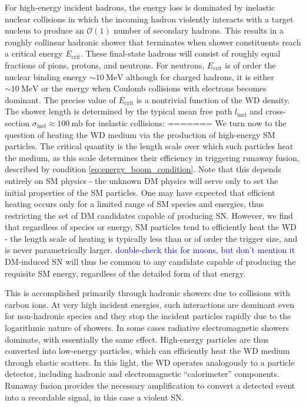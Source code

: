 \documentclass[twocolumn, preprintnumbers,amsmath,amssymb,prd, superscriptaddress]{revtex4}
\newcommand{\OO}{\mathcal{O}}
\newcommand{\MeV}{\text{MeV}}
\begin{document}
For high-energy incident hadrons, the energy loss is dominated by inelastic nuclear collisions in which the incoming hadron violently interacts with a target nucleus to produce an $\OO(1)$ number of secondary hadrons.
This results in a roughly collinear hadronic shower that terminates when shower constituents reach a critical energy $E_\text{crit}$.
These final-state hadrons will consist of roughly equal fractions of pions, protons, and neutrons.
For neutrons, $E_\text{crit}$ is of order the nuclear binding energy $\sim 10 ~\text{MeV}$ although for charged hadrons, it is either $\sim 10 ~\MeV$ or the energy when Coulomb collisions with electrons becomes dominant.
The precise value of $E_\text{crit}$ is a nontrivial function of the WD density.
The shower length is determined by the typical mean free path $l_\text{inel}$ and cross-section $\sigma_\text{inel} \approx 100 ~\text{mb}$ for inelastic collisions:
=======
We turn now to the question of heating the WD medium via the production of high-energy SM particles. 
The critical quantity is the length scale over which such particles heat the medium, as this scale determines their efficiency in triggering runaway fusion, described by condition \eqref{eq:energy_boom_condition}.   
Note that this depends entirely on SM physics - the unknown DM physics will serve only to set the initial properties of the SM particles.
One may have expected that efficient heating occurs only for a limited range of SM species and energies, thus restricting the set of DM candidates capable of producing SN. 
However, we find that regardless of species or energy, SM particles tend to efficiently heat the WD - the length scale of heating is typically less than or of order the trigger size, and is never parametrically larger.
\textcolor{blue}{double-check this for muons, but don't mention it}
DM-induced SN will thus be common to any candidate capable of producing the requisite SM energy, regardless of the detailed form of that energy. 

This is accomplished primarily through hadronic showers due to collisions with carbon ions. 
At very high incident energies, such interactions are dominant even for non-hadronic species and they stop the incident particles rapidly due to the logarithmic nature of showers. 
In some cases radiative electromagnetic showers dominate, with essentially the same effect.
High-energy particles are thus converted into low-energy particles, which can efficiently heat the WD medium through elastic scatters.  
In this light, the WD operates analogously to a particle detector, including hadronic and electromagnetic ``calorimeter'' components.
Runaway fusion provides the necessary amplification to convert a detected event into a recordable signal, in this case a violent SN.  
\end{document}
